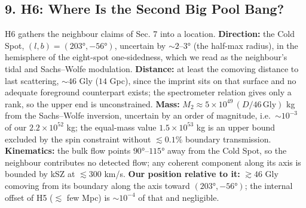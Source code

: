 \documentclass[
]{article}
\begin{document}
\hypertarget{h6-where-is-the-second-big-pool-bang}{%
\subsection{\texorpdfstring{\textbf{9. H6: Where Is the Second Big Pool
Bang?}}{9. H6: Where Is the Second Big Pool Bang?}}\label{h6-where-is-the-second-big-pool-bang}}

H6 gathers the neighbour claims of Sec. 7 into a location.
\textbf{Direction:} the Cold Spot, \((l, b) = (203°, -56°)\), uncertain
by \(\sim\!2\)--\(3°\) (the half-max radius), in the hemisphere of the
eight-spot one-sidedness, which we read as the neighbour's tidal and
Sachs--Wolfe modulation. \textbf{Distance:} at least the comoving
distance to last scattering, \(\sim\!46\) Gly (\(14\) Gpc), since the
imprint sits on that surface and no adequate foreground counterpart
exists; the spectrometer relation gives only a rank, so the upper end is
unconstrained. \textbf{Mass:}
\(M_2 \approx 5\times10^{49}\,(D/46\,\text{Gly})\) kg from the
Sachs--Wolfe inversion, uncertain by an order of magnitude,
i.e.~\(\sim\!10^{-3}\) of our \(2.2\times10^{52}\) kg; the equal-mass
value \(1.5\times10^{53}\) kg is an upper bound excluded by the spin
constraint without \(\lesssim 0.1\%\) boundary transmission.
\textbf{Kinematics:} the bulk flow points \(90°\)--\(115°\) away from
the Cold Spot, so the neighbour contributes no detected flow; any
coherent component along its axis is bounded by kSZ at \(\lesssim 300\)
km/s. \textbf{Our position relative to it:} \(\gtrsim 46\) Gly comoving
from its boundary along the axis toward \((203°, -56°)\); the internal
offset of H5 (\(\lesssim\) few Mpc) is \(\sim\!10^{-4}\) of that and
negligible.
\end{document}
